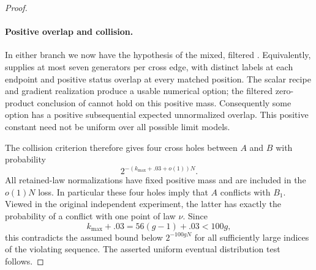 \begin{proof}
\paragraph{Positive overlap and collision.}
In either branch we now have the hypothesis of the mixed,
filtered .  Equivalently,
 supplies at most seven generators per
cross edge, with distinct labels at each endpoint and positive
status overlap at every matched position.  The scalar recipe
and gradient realization produce a usable numerical option;
the filtered zero-product conclusion of
 cannot hold on this positive mass.
Consequently some option has a positive subsequential expected
unnormalized overlap.  This positive constant need not be
uniform over all possible limit models.

The collision criterion  therefore gives
four cross holes between \(A\) and \(B\) with probability
\[
 2^{-(k_{\max}+.03+o(1))N}.
\]
All retained-law normalizations have fixed positive mass and
are included in the \(o(1)N\) loss.  In particular these four
holes imply that \(A\) conflicts with \(B_1\).  Viewed in
the original independent experiment, the latter has exactly
the probability of a conflict with one point of law \(\nu\).
Since
\[
 k_{\max}+.03=56(g-1)+.03<100g,
\]
this contradicts the assumed bound below \(2^{-100gN}\) for
all sufficiently large indices of the violating sequence.
The asserted uniform eventual distribution test follows.
\end{proof}
